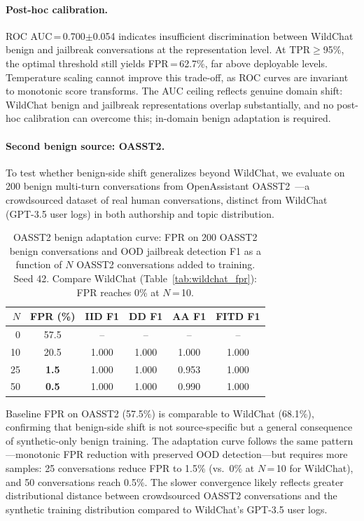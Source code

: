 \paragraph{Post-hoc calibration.}
ROC AUC\,=\,0.700$\pm$0.054 indicates insufficient discrimination between WildChat benign and jailbreak conversations at the representation level. At TPR$\geq$95\%, the optimal threshold still yields FPR\,=\,62.7\%, far above deployable levels. Temperature scaling cannot improve this trade-off, as ROC curves are invariant to monotonic score transforms. The AUC ceiling reflects genuine domain shift: WildChat benign and jailbreak representations overlap substantially, and no post-hoc calibration can overcome this; in-domain benign adaptation is required.

\paragraph{Second benign source: OASST2.}
\label{app:oasst2}

To test whether benign-side shift generalizes beyond WildChat, we evaluate on 200 benign multi-turn conversations from OpenAssistant OASST2~\citep{kopf2023openassistant}---a crowdsourced dataset of real human conversations, distinct from WildChat (GPT-3.5 user logs) in both authorship and topic distribution.

\begin{table}[ht]
\centering
\footnotesize
\caption{OASST2 benign adaptation curve: FPR on 200 OASST2 benign conversations and OOD jailbreak detection F1 as a function of $N$ OASST2 conversations added to training. Seed 42. Compare WildChat (Table~\ref{tab:wildchat_fpr}): FPR reaches 0\% at $N$\,=\,10.}
\label{tab:oasst2_curve}
\begin{tabular}{@{}rccccc@{}}
\toprule
$N$ & FPR (\%) & IID F1 & DD F1 & AA F1 & FITD F1 \\
\midrule
0 & 57.5 & -- & -- & -- & -- \\
10 & 20.5 & 1.000 & 1.000 & 1.000 & 1.000 \\
25 & \textbf{1.5} & 1.000 & 1.000 & 0.953 & 1.000 \\
50 & \textbf{0.5} & 1.000 & 1.000 & 0.990 & 1.000 \\
\bottomrule
\end{tabular}
\end{table}

Baseline FPR on OASST2 (57.5\%) is comparable to WildChat (68.1\%), confirming that benign-side shift is not source-specific but a general consequence of synthetic-only benign training. The adaptation curve follows the same pattern---monotonic FPR reduction with preserved OOD detection---but requires more samples: 25 conversations reduce FPR to 1.5\% (vs.\ 0\% at $N$\,=\,10 for WildChat), and 50 conversations reach 0.5\%. The slower convergence likely reflects greater distributional distance between crowdsourced OASST2 conversations and the synthetic training distribution compared to WildChat's GPT-3.5 user logs.


